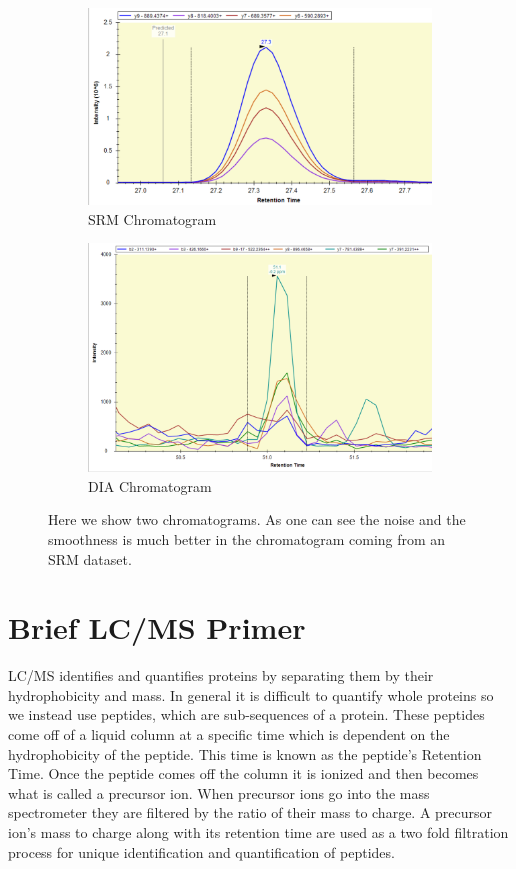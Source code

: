 \documentclass[12pt]{article}
\begin{document}
{\begin{figure}
\centering
\begin{subfigure}{.5\textwidth}
  \centering
  \includegraphics[width=1\linewidth]{smoothExample.png}
  \caption{SRM Chromatogram}
  \label{fig:sub1}
\end{subfigure}%
\begin{subfigure}{.5\textwidth}
  \centering
  \includegraphics[width=1\linewidth]{DIA_example}
  \caption{DIA Chromatogram}
  \label{fig:sub2}
\end{subfigure}
\caption{Here we show two chromatograms. As one can see the noise and the smoothness is much better in the chromatogram coming from an SRM dataset.}
\label{fig:test}
\end{figure}

\section{Brief LC/MS Primer}
LC/MS identifies and quantifies proteins by separating them by their hydrophobicity and mass. In general it is difficult to quantify whole proteins so we instead use peptides, which are sub-sequences of a protein. These peptides come off of a liquid column at a specific time which is dependent on the hydrophobicity of the peptide. This time is known as the peptide's Retention Time. Once the peptide comes off the column it is ionized and then becomes what is called a precursor ion. When precursor ions go into the mass spectrometer they are filtered by the ratio of their mass to charge. A precursor ion's mass to charge along with its retention time are used as a two fold filtration process for unique identification and quantification of peptides. 

}
\end{document}
